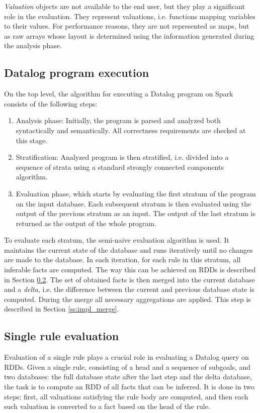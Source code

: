 \emph{Valuation} objects are not available to the end user, but they play a significant role in the evaluation. They represent valuations, i.e. functions mapping variables to their values. For performance reasons, they are not represented as maps, but as raw arrays whose layout is determined using the information generated during the analysis phase.

\subsection{Datalog program execution}

On the top level, the algorithm for executing a Datalog program on Spark consists of the following steps:

\begin{enumerate}
\item Analysis phase: Initially, the program is parsed and analyzed both syntactically and semantically. All correctness requirements are checked at this stage.

\item Stratification: Analyzed program is then stratified, i.e. divided into a sequence of strata using a standard strongly connected components algorithm.

\item Evaluation phase, which starts by evaluating the first stratum of the program on the input database. Each subsequent stratum is then evaluated using the output of the previous stratum as an input. The output of the last stratum is returned as the output of the whole program.

\end{enumerate}

To evaluate each stratum, the semi-naive evaluation algorithm is used. It maintains the current state of the database and runs iteratively until no changes are made to the database. In each iteration, for each rule in this stratum, all inferable facts are computed. The way this can be achieved on RDDs is described in Section \ref{ss:impl_evalrule}. The set of obtained facts is then merged into the current database and a \emph{delta}, i.e. the difference between the current and previous database state is computed. During the merge all necessary aggregations are applied. This step is described in Section \ref{ss:impl_merge}.

\subsection{Single rule evaluation}\label{ss:impl_evalrule}
Evaluation of a single rule plays a crucial role in evaluating a Datalog query on RDDs. Given a single rule, consisting of a head and a sequence of subgoals, and two databases: the full database state after the last step and the delta database, the task is to compute an RDD of all facts that can be inferred. It is done in two steps: first, all valuations satisfying the rule body are computed, and then each such valuation is converted to a fact based on the head of the rule.

